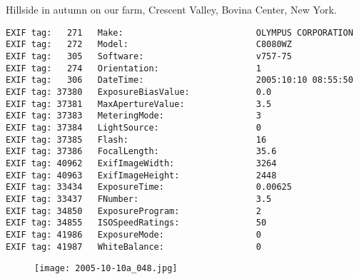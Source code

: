 \section{\protect{}}
\noindent Hillside in autumn on our farm, Crescent Valley, Bovina Center, New York.
\noindent
\begin{lstlisting}
EXIF tag:   271   Make:                          OLYMPUS CORPORATION
EXIF tag:   272   Model:                         C8080WZ
EXIF tag:   305   Software:                      v757-75
EXIF tag:   274   Orientation:                   1
EXIF tag:   306   DateTime:                      2005:10:10 08:55:50
EXIF tag: 37380   ExposureBiasValue:             0.0
EXIF tag: 37381   MaxApertureValue:              3.5
EXIF tag: 37383   MeteringMode:                  3
EXIF tag: 37384   LightSource:                   0
EXIF tag: 37385   Flash:                         16
EXIF tag: 37386   FocalLength:                   35.6
EXIF tag: 40962   ExifImageWidth:                3264
EXIF tag: 40963   ExifImageHeight:               2448
EXIF tag: 33434   ExposureTime:                  0.00625
EXIF tag: 33437   FNumber:                       3.5
EXIF tag: 34850   ExposureProgram:               2
EXIF tag: 34855   ISOSpeedRatings:               50
EXIF tag: 41986   ExposureMode:                  0
EXIF tag: 41987   WhiteBalance:                  0

\end{lstlisting}
\clearpage
\begin{figure}
\raggedleft
\texttt{[image: 2005-10-10a\_048.jpg]}
\end{figure}


\clearpage
